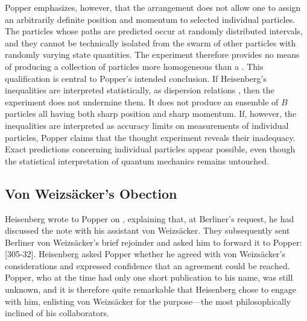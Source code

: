 \documentclass[final,12pt]{article}
\newcommand{\vW}{von Weizsäcker\xspace}
\newcommand{\VW}{Von Weizsäcker\xspace}
\begin{document}
Popper emphasizes, however, that the arrangement does not allow one to assign an arbitrarily definite position and momentum to selected individual particles. The particles whose paths are predicted occur at randomly distributed intervals, and they cannot be technically isolated from the swarm of other particles with randomly varying state quantities. The experiment therefore provides no means of producing a collection of particles more homogeneous than a . This qualification is central to Popper's intended conclusion. If Heisenberg's inequalities are interpreted statistically, as dispersion relations , then the experiment does not undermine them. It does not produce an ensemble of $B$ particles all having both sharp position and sharp momentum. If, however, the inequalities are interpreted as accuracy limits  on measurements of individual particles, Popper claims that the thought experiment reveals their inadequacy. Exact predictions concerning individual particles appear possible, even though the statistical interpretation of quantum mechanics remains untouched.
 
\subsection{\VW's Obection}
%
Heisenberg wrote to Popper on , explaining that, at Berliner's request, he had discussed the note with his assistant \vW. They subsequently sent Berliner \vW's brief rejoinder and asked him to forward it to Popper: [305-32]. Heisenberg asked Popper whether he agreed with \vW's considerations and expressed confidence that an agreement could be reached. Popper, who at the time had only one short publication to his name, was still unknown, and it is therefore quite remarkable that Heisenberg chose to engage with him, enlisting \vW for the purpose---the most philosophically inclined of his collaborators.
\end{document}
